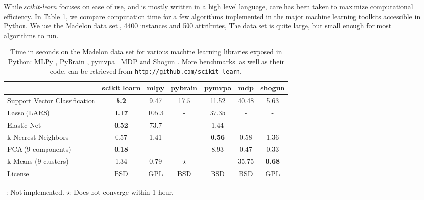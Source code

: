 \documentclass[twoside,11pt]{article}
\begin{document}
While \emph{scikit-learn} focuses on ease of use, and is
mostly written in a high level language, care has been taken to maximize
computational efficiency. In Table \ref{tab:comparisons}, we compare
computation time for a few algorithms implemented in the major machine
learning toolkits accessible in Python. We use the Madelon data
set \citep{Guyon2004}, 4400 instances and 500 attributes,
The data set is quite large, but small enough for most
algorithms to run.

\begin{table}[t]
{\small
\hspace*{.03\linewidth}%
\begin{tabular}{l c c c c c c}
\hline\hline %
 & scikit-learn & mlpy & pybrain & pymvpa &  mdp & shogun \\ [0.5ex]
\hline
Support Vector Classification & {\bf 5.2} & 9.47 & 17.5 & 11.52 & 40.48 & 5.63 \\
Lasso (LARS) & {\bf 1.17} & 105.3   & - &  37.35 & - & - \\
Elastic Net & {\bf 0.52} & 73.7 & -  &  1.44  & -  & - \\
k-Nearest Neighbors & 0.57 & 1.41 & - &  {\bf 0.56} & 0.58 & 1.36 \\
PCA (9 components) & {\bf 0.18} & - & - & 8.93  & 0.47 & 0.33 \\
k-Means (9 clusters) & 1.34 &  0.79 & $\star$ & -  & 35.75 & {\bf 0.68} \\
License &  BSD & GPL & BSD  &  BSD  & BSD  & GPL \\
\hline
\end{tabular}

-: Not implemented. \hfill
$\star$: Does not converge within 1 hour.
}

\vspace*{-1.5ex}
\caption{
Time in seconds on the Madelon data set for various machine learning libraries exposed in Python:
MLPy \citep{albanese2008}, PyBrain \citep{schaul2010}, pymvpa
\citep{hanke2009}, MDP \citep{zito2008} and Shogun
\citep{sonnenburg2010}. 
More benchmarks, as well as their code, can be retrieved from {\tt http://github.com/scikit-learn}.
\vspace*{-1.5em}\label{tab:comparisons}
}
\end{table}
\end{document}
